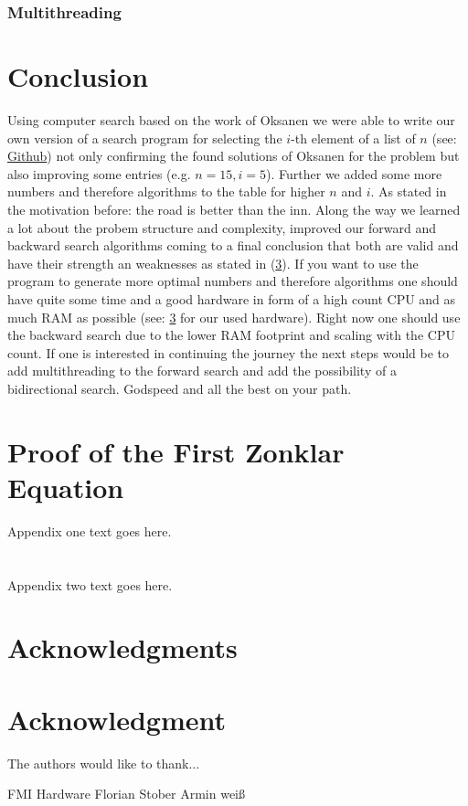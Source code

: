 \documentclass[10pt,journal,compsoc]{IEEEtran}
\begin{document}
\subsubsection{Multithreading}

\section{Conclusion}
Using computer search based on the work of Oksanen we were able to write our own
version of a search program for selecting the $i$-th element of a list of $n$
(see: \href{https://github.com/JGDoerrer/selection_generator}{Github}) not only
confirming the found solutions of Oksanen for the problem but also improving
some entries (e.g. $n=15, i=5$). Further we added some more numbers and
therefore algorithms to the table for higher $n$ and $i$. As stated in the
motivation before: the road is better than the inn. Along the way we learned a
lot about the probem structure and complexity, improved our forward and backward
search algorithms coming to a final conclusion that both are valid and have
their strength an weaknesses as stated in (\ref{}). If you want to use the
program to generate more optimal numbers and therefore algorithms one should
have quite some time and a good hardware in form of a high count CPU and as much
RAM as possible (see: \ref{} for our used hardware). Right now one should use
the backward search due to the lower RAM footprint and scaling with the CPU
count. If one is interested in continuing the journey the next steps would be to
add multithreading to the forward search and add the possibility of a
bidirectional search. Godspeed and all the best on your path.



\appendices
\section{Proof of the First Zonklar Equation}
Appendix one text goes here.
\section{}
Appendix two text goes here.


\ifCLASSOPTIONcompsoc
  \section*{Acknowledgments}
\else
  \section*{Acknowledgment}
\fi


The authors would like to thank...

FMI
Hardware
Florian Stober
Armin weiß

\ifCLASSOPTIONcaptionsoff
  \newpage
\fi




\end{document}
